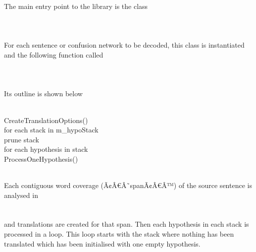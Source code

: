 \documentclass[10pt]{report}
\theoremstyle{plain}
\begin{document}
{The main entry point to the library is the class\\
\\
\\
\\
For each sentence or confusion network to be decoded, this class is instantiated and the following function called\\
\\
\\
\\
Its outline is shown below\\
\\
\begin{tt}
\indent CreateTranslationOptions()\\
\indent for each stack in m\_hypoStack\\
\indent \indent prune stack\\
\indent \indent for each hypothesis in stack\\
\indent \indent \indent ProcessOneHypothesis()\\
\end{tt}\\
Each contiguous word coverage (Ã¢Â€Â˜spanÃ¢Â€Â™) of the source sentence is analysed in\\ 
\\
\\
and translations are created for that span. Then each hypothesis in each stack is processed in a loop. This loop starts with the stack where nothing has been translated which has been initialised with one empty hypothesis.
\\
}
\end{document}
